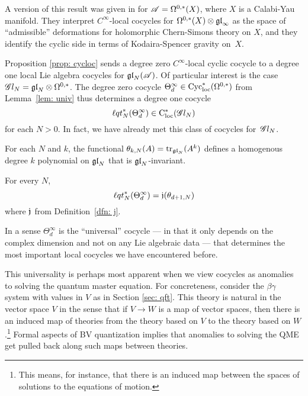 \begin{rmk}
A version of this result was given in \cite{CL1} for $\mathscr A = \Omega^{0,*}(X)$, 
where $X$ is a Calabi-Yau manifold.
They interpret $C^\infty$-local cocycles for $\Omega^{0,*}(X) \otimes {\mathfrak{gl}}_\infty$ as the space of ``admissible'' deformations for holomorphic Chern-Simons theory on $X$,
and they identify the cyclic side in terms of Kodaira-Spencer gravity on~$X$.
\end{rmk}

Proposition \ref{prop: cycloc} sends a degree zero $C^\infty$-local cyclic cocycle to a degree one local Lie algebra cocycles for ${\mathfrak{gl}}_N(\mathscr A)$.
Of particular interest is the case $\mathscr G l_{N} = {\mathfrak{gl}}_N \otimes \Omega^{0,*}$. 
The degree zero cocycle $\Theta_d^\infty \in {\rm Cyc}_{\rm loc}^*(\Omega^{0,*})$ from Lemma~\ref{lem: univ} thus determines a degree one cocycle 
\[
{\ell q t}^*_N(\Theta_d^\infty) \in {\rm C}_{\rm loc}^*(\mathscr G l_N)
\]
for each $N > 0$. 
In fact, we have already met this class of cocycles for~$\mathscr G l_{N}$. 

\begin{dfn}
For each $N$ and $k$, the functional $\theta_{k,N}(A) = {\rm tr}_{{\mathfrak{gl}}_N} (A^k)$ defines a homogenous degree $k$ polynomial on ${\mathfrak{gl}}_N$ that is ${\mathfrak{gl}}_N$-invariant.
\end{dfn}

\begin{lem}
\label{lem:pullbackofthetainfinity}
For every $N$, 
\[
{\ell q t}_N^*(\Theta_d^\infty) = \mathfrak j(\theta_{d+1, N})
\]
where $\mathfrak j$ from Definition~\ref{dfn: j}.
\end{lem}

In a sense $\Theta^\infty_d$ is the ``universal'' cocycle --- in that it only depends on the complex dimension and not on any Lie algebraic data --- that determines the most important local cocycles we have encountered before.

This universality is perhaps most apparent when we view cocycles as anomalies to solving the quantum master equation. 
For concreteness, consider the $\beta\gamma$ system with values in $V$ as in Section \ref{sec: qft}.
This theory is natural in the vector space $V$ in the sense that if $V \to W$ is a map of vector spaces, then there is an induced map of theories from the theory based on $V$ to the theory based on $W$.\footnote{This means, for instance, that there is an induced map between the spaces of solutions to the equations of motion.}
Formal aspects of BV quantization implies that anomalies to solving the QME get pulled back along such maps between theories. 

